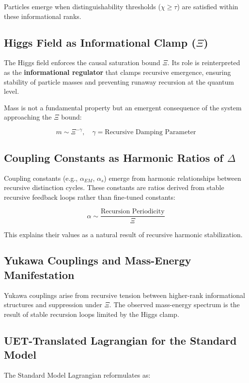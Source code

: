 \documentclass[12pt,a4paper]{article}
\begin{document}
Particles emerge when distinguishability thresholds (\(\chi \geq \tau\)) are satisfied within these informational ranks.

\subsection{Higgs Field as Informational Clamp (\(\Xi\))}

The Higgs field enforces the causal saturation bound \(\Xi\). Its role is reinterpreted as the \textbf{informational regulator} that clamps recursive emergence, ensuring stability of particle masses and preventing runaway recursion at the quantum level.

Mass is not a fundamental property but an emergent consequence of the system approaching the \(\Xi\) bound:

\[
m \sim \Xi^{-\gamma}, \quad \gamma = \text{Recursive Damping Parameter}
\]

\subsection{Coupling Constants as Harmonic Ratios of \(\Delta\)}

Coupling constants (e.g., \(\alpha_{EM}\), \(\alpha_s\)) emerge from harmonic relationships between recursive distinction cycles. These constants are ratios derived from stable recursive feedback loops rather than fine-tuned constants:

\[
\alpha \sim \frac{\text{Recursion Periodicity}}{\Xi}
\]

This explains their values as a natural result of recursive harmonic stabilization.

\subsection{Yukawa Couplings and Mass-Energy Manifestation}

Yukawa couplings arise from recursive tension between higher-rank informational structures and suppression under \(\Xi\). The observed mass-energy spectrum is the result of stable recursion loops limited by the Higgs clamp.

\subsection{UET-Translated Lagrangian for the Standard Model}

The Standard Model Lagrangian reformulates as:
\end{document}
